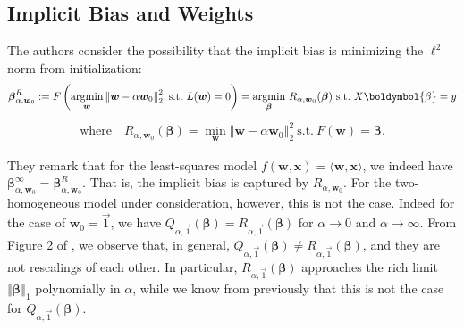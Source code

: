 \documentclass{article}
\begin{document}
\subsection{Implicit Bias and Weights}
The authors consider the possibility that the implicit bias is minimizing the $\ell^2$ norm from initialization:
\begin{align*}
    \boldsymbol{\beta}_{\alpha, \boldsymbol{w}_0}^R := F \left( \underset{\boldsymbol{w}}{\text{argmin}} \left\Vert \boldsymbol{w} - \alpha \boldsymbol{w}_0 \right\Vert_2^2 \ \text{s.t.} \ L(\boldsymbol{w}) = 0 \right) = \underset{\boldsymbol{\beta}}{\text{argmin}} \ R_{\alpha, \boldsymbol{w}_0}(\boldsymbol{\beta}) \ \text{s.t.} \ X \boldymbol{\beta} = y
\end{align*}
\begin{align*}
    \text{where} \quad R_{\alpha, \boldsymbol{w}_0}(\boldsymbol{\beta}) = \underset{\boldsymbol{w}}{\min} \left\Vert \boldsymbol{w} - \alpha \boldsymbol{w}_0 \right\Vert_2^2 \ \text{s.t.} \ F(\boldsymbol{w}) = \boldsymbol{\beta}.
\end{align*}

They remark that for the least-squares model $f(\boldsymbol{w}, \boldsymbol{x}) = \langle \boldsymbol{w}, \boldsymbol{x} \rangle$, we indeed have $\boldsymbol{\beta}_{\alpha, \boldsymbol{w}_0}^{\infty} = \boldsymbol{\beta}_{\alpha, \boldsymbol{w}_0}^{R}$. That is, the implicit bias is captured by $R_{\alpha, \boldsymbol{w}_0}$. For the two-homogeneous model under consideration, however, this is not the case. Indeed for the case of $\boldsymbol{w}_0 = \vec{1}$, we have $Q_{\alpha, \vec{1}}(\boldsymbol{\beta}) = R_{\alpha, \vec{1}}(\boldsymbol{\beta})$ for $\alpha \rightarrow 0$ and $\alpha \rightarrow \infty$. From Figure 2 of \cite{woodworth2020kernel}, we observe that, in general, $Q_{\alpha, \vec{1}}(\boldsymbol{\beta}) \neq R_{\alpha, \vec{1}}(\boldsymbol{\beta})$, and they are not rescalings of each other. In particular, $R_{\alpha, \vec{1}}(\boldsymbol{\beta})$ approaches the rich limit $\left\Vert \boldsymbol{\beta} \right\Vert_1$ polynomially in $\alpha$, while we know from previously that this is not the case for $Q_{\alpha, \vec{1}}(\boldsymbol{\beta})$.
\end{document}
